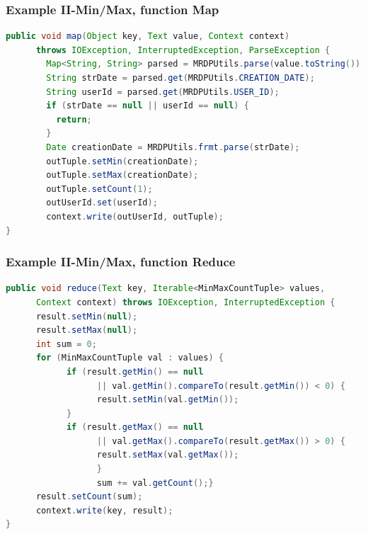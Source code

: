 \documentclass[xcolor=dvipsnames,dvip,notes=show,table]{beamer}
\begin{document}
\begin{frame}[fragile]
  \frametitle{Example II-Min/Max, function Map}

\begin{lstlisting}[language=Java]
public void map(Object key, Text value, Context context)
      throws IOException, InterruptedException, ParseException {
        Map<String, String> parsed = MRDPUtils.parse(value.toString());
        String strDate = parsed.get(MRDPUtils.CREATION_DATE);
        String userId = parsed.get(MRDPUtils.USER_ID);
        if (strDate == null || userId == null) {
          return;
        }
        Date creationDate = MRDPUtils.frmt.parse(strDate);
        outTuple.setMin(creationDate);
        outTuple.setMax(creationDate);
        outTuple.setCount(1);
        outUserId.set(userId);
        context.write(outUserId, outTuple);
}
\end{lstlisting}

\end{frame}

\begin{frame}[fragile]
  \frametitle{Example II-Min/Max, function Reduce}

\begin{lstlisting}[language=Java]
public void reduce(Text key, Iterable<MinMaxCountTuple> values,
      Context context) throws IOException, InterruptedException {
      result.setMin(null);
      result.setMax(null);
      int sum = 0;
      for (MinMaxCountTuple val : values) {
            if (result.getMin() == null
                  || val.getMin().compareTo(result.getMin()) < 0) {
                  result.setMin(val.getMin());
            }
            if (result.getMax() == null
                  || val.getMax().compareTo(result.getMax()) > 0) {
                  result.setMax(val.getMax());
                  }
                  sum += val.getCount();}
      result.setCount(sum);
      context.write(key, result);
}
\end{lstlisting}

\end{frame}


\end{document}
